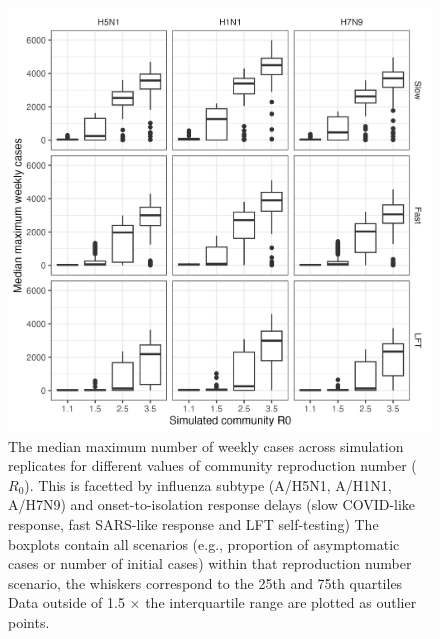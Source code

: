 \documentclass{article}
\begin{document}
\begin{figure}[ht]
\centering
\includegraphics[width=\textwidth]{../plots/max_weekly_cases.png}
\caption{The median maximum number of weekly cases across simulation replicates for different values of community reproduction number ($R_0$). This is facetted by influenza subtype (A/H5N1, A/H1N1, A/H7N9) and onset-to-isolation response delays (slow COVID-like response, fast SARS-like response and LFT self-testing) The boxplots contain all scenarios (e.g., proportion of asymptomatic cases or number of initial cases) within that reproduction number scenario, the whiskers correspond to the 25th and 75th quartiles Data outside of 1.5 $\times$ the interquartile range are plotted as outlier points.}
\label{fig:max-weekly-cases}
\end{figure}
\end{document}
